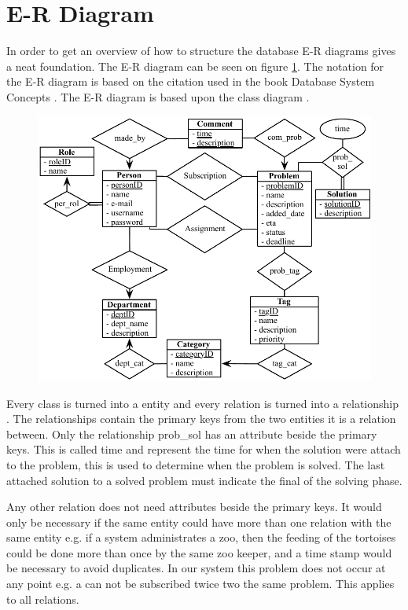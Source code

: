 \newcommand{\erdiagram}[1][]{E-R diagram}
\section{E-R Diagram}
In order to get an overview of how to structure the database \erdiagram[]s gives a neat foundation. The \erdiagram[] can be seen on figure \ref{fig:er_diagram}. The notation for the \erdiagram[] is based on the citation used in the book Database System Concepts \cite[p. 305]{Sudershan2011}. 
The \erdiagram[] is based upon the class diagram . 

\begin{figure}[h]
	\centering
		\includegraphics[scale=0.8]{input/implementation/database/ER-diagram.pdf}
	\label{fig:er_diagram}
\end{figure}

Every class is turned into a entity and every relation is turned into a relationship \cite[p. 259 - 321]{Sudershan2011}. The relationships contain the primary keys from the two entities it is a relation between. Only the relationship prob\_sol has an attribute beside the primary keys. This is called time and represent the time for when the solution were attach to the problem, this is used to determine when the problem is solved. The last attached solution to a solved problem must indicate the final of the solving phase. 

Any other relation does not need attributes beside the primary keys. It would only be necessary if the same entity could have more than one relation with the same entity e.g. if a system administrates a zoo, then the feeding of the tortoises could be done more than once by the same zoo keeper, and a time stamp would be necessary to avoid duplicates. In our system this problem does not occur at any point e.g. a \client[] can not be subscribed twice two the same problem. This applies to all relations. 

